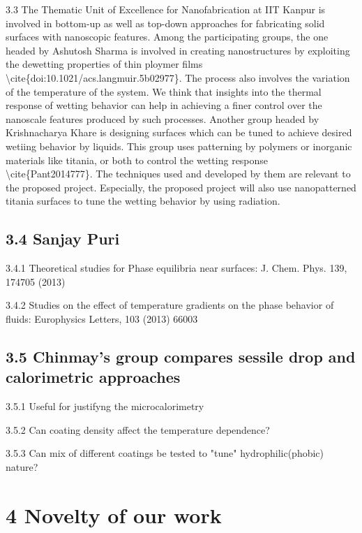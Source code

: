 \par 3.3 The Thematic Unit of Excellence for Nanofabrication at IIT Kanpur is involved in bottom-up as well as top-down approaches for fabricating solid surfaces with nanoscopic features. Among the participating groups, the one headed by Ashutosh Sharma is involved in creating nanostructures by exploiting the dewetting properties of thin ploymer films \textbackslash cite\{doi:10.1021/acs.langmuir.5b02977\}. The process also involves the variation of the temperature of the system. We think that insights into the thermal response of wetting behavior can help in achieving a finer control over the nanoscale features produced by such processes. Another group headed by Krishnacharya Khare is designing surfaces which can be tuned to achieve desired wetiing behavior by liquids. This group uses patterning by polymers or inorganic materials like titania, or both to control the wetting response \textbackslash cite\{Pant2014777\}. The techniques used and developed by them are relevant to the proposed project. Especially, the proposed project will also use nanopatterned titania surfaces to tune the wetting behavior by using radiation.\subsection{3.4 Sanjay Puri}

\par 3.4.1 Theoretical studies for Phase equilibria near surfaces: J. Chem. Phys. 139, 174705 (2013)
\par 3.4.2 Studies on the effect of temperature gradients on the phase behavior of fluids: Europhysics Letters, 103 (2013) 66003\subsection{3.5 Chinmay's group compares sessile drop and calorimetric approaches}

\par 3.5.1 Useful for justifyng the microcalorimetry
\par 3.5.2 Can coating density affect the temperature dependence?
\par 3.5.3 Can mix of different coatings be tested to "tune" hydrophilic(phobic) nature?\section{4 Novelty of our work}

